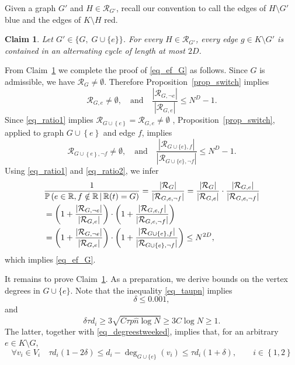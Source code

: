 \documentclass[12pt,reqno]{amsart}
\newcommand{\rc}{{\mathcal{R}}}
\newcommand{\Prob} {\mathbb {P}}
\newcommand{\prob}[1]{\Prob\left(#1\right)}
\newcommand{\Pc}[2]{\prob{#1\,|\,#2}}
\newcommand{\R} {\mathbb R}
\newtheorem{claim}[theorem]{Claim}
\theoremstyle{definition}
\begin{document}
Given a graph $G'$ and $H\in\rc_{G'}$, recall our convention to call the edges of $H\setminus G'$ blue and the edges of $K\setminus H$ red.
\begin{claim}
  \label{clm_alt}
  Let $G'\in\{ G,\;G\cup \{e\}\}$.
  For every $H \in \rc_{G'}$, every edge $g \in K \setminus G'$ is contained in an alternating cycle of length at most $2D$.
\end{claim}
From Claim~\ref{clm_alt} we complete the proof of \eqref{eq_ef_G} as follows.
Since $G$ is admissible, we have $\rc_G \ne \emptyset$. Therefore Proposition~\ref{prop_switch} implies
\begin{equation}
  \label{eq_ratio1}
  \rc_{G, e} \neq \emptyset, \quad \text{and} \quad \frac{|\rc_{G,\neg e}|}{|\rc_{G,e}|} \le N^{D} - 1.
\end{equation}
Since \eqref{eq_ratio1} implies $\rc_{G \cup \left\{ e \right\}} = \rc_{G, e} \ne \emptyset$ , Proposition~\ref{prop_switch}, applied to graph $G \cup \left\{ e \right\}$ and edge $f$, implies
\begin{equation}
  \label{eq_ratio2}
  \rc_{G \cup \left\{ e \right\}, \neg f} \neq \emptyset, \quad\text{and} \quad
  \frac{|\rc_{G \cup\{e\},f}|}{|\rc_{G \cup \{e\},\neg f}|} \le N^{D} - 1.
\end{equation}
Using \eqref{eq_ratio1} and \eqref{eq_ratio2}, we infer
\begin{align*}
  \notag	&\frac{1}{\Pc{e \in \R, f \notin \R}{\R(t) = G}} = \frac{|\rc_G|}{|\rc_{G,e,\neg f}|} = \frac{|\rc_G|}{|\rc_{G,e}|} \cdot \frac{|\rc_{G,e}|}{|\rc_{G,e,\neg f}|} \\
	&= \left( 1 + \frac{|\rc_{G,\neg e}|}{|\rc_{G,e}|} \right) \cdot \left( 1 + \frac{|\rc_{G,e,f}|}{|\rc_{G,e,\neg f}|} \right) \\
	&=  \left( 1 + \frac{|\rc_{G,\neg e}|}{|\rc_{G,e}|} \right) \cdot \left( 1 + \frac{|\rc_{G \cup\{e\},f}|}{|\rc_{G \cup \{e\},\neg f}|} \right)
	\le N^{2D},
\end{align*}
which implies \eqref{eq_ef_G}.

\smallskip

It remains to prove Claim~\ref{clm_alt}. As a preparation, we derive bounds on the vertex degrees in $G\cup\{e\}$.
Note that the inequality \eqref{eq_taupn} implies
\begin{equation}
  \label{eq_deltas}
  \delta \le 0.001,
\end{equation}
and
\begin{equation}
  \label{eq_delta_lower}
	\delta \tau d_i \ge 3 \sqrt{C\tau p\hat n  \log N } \ge 3C \log N \ge 1.
\end{equation}
The latter, together with \eqref{eq_degreestweeked}, implies that, for an arbitrary $e \in K \setminus G$,
\begin{equation}
  \label{eq_degreestweeked_cup_e}
	\forall v_i \in V_i \quad \tau d_i (1 - 2\delta) \le d_i - \deg_{G\cup \{e\}}(v_i) \le \tau d_i (1 + \delta), \qquad i \in \left\{ 1,2 \right\}
\end{equation}
\end{document}
